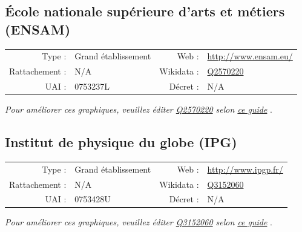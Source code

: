 \documentclass[12pt,french,landscape]{article}
\begin{document}
\newpage

\hypertarget{uxe9cole-nationale-supuxe9rieure-darts-et-muxe9tiers-ensam}{%
\subsection{École nationale supérieure d'arts et métiers
(ENSAM)}\label{uxe9cole-nationale-supuxe9rieure-darts-et-muxe9tiers-ensam}}

\begin{tabular*}{0.45\textwidth}{rp{2cm}rl}  
\hline  
Type : & Grand établissement & Web : &\href{http://www.ensam.eu/}{http://www.ensam.eu/} \\  
Rattachement : & N/A & Wikidata : & \href{https://www.wikidata.org/entity/Q2570220}{Q2570220} \\  
UAI : & 0753237L & Décret : & N/A \\  
\hline  
\end{tabular*}

\textit{\scriptsize Pour améliorer ces graphiques, veuillez éditer \href{https://www.wikidata.org/entity/Q2570220}{Q2570220}  selon \href{https://github.com/cpesr/wikidataESR/blob/master/Rmd/wikidataESR.md}{ce guide}}
.


\newpage

\hypertarget{institut-de-physique-du-globe-ipg}{%
\subsection{Institut de physique du globe
(IPG)}\label{institut-de-physique-du-globe-ipg}}

\begin{tabular*}{0.45\textwidth}{rp{2cm}rl}  
\hline  
Type : & Grand établissement & Web : &\href{http://www.ipgp.fr/}{http://www.ipgp.fr/} \\  
Rattachement : & N/A & Wikidata : & \href{https://www.wikidata.org/entity/Q3152060}{Q3152060} \\  
UAI : & 0753428U & Décret : & N/A \\  
\hline  
\end{tabular*}

\textit{\scriptsize Pour améliorer ces graphiques, veuillez éditer \href{https://www.wikidata.org/entity/Q3152060}{Q3152060}  selon \href{https://github.com/cpesr/wikidataESR/blob/master/Rmd/wikidataESR.md}{ce guide}}
.
\end{document}
